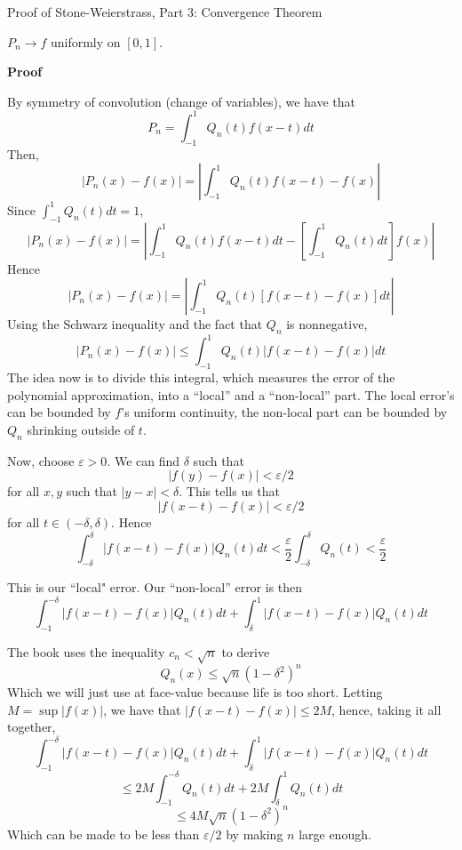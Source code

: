 \begin{result}
    {Proof of Stone-Weierstrass, Part 3: Convergence}
    {Theorem}

    $P_n \rightarrow f$ uniformly on $[0, 1]$.

    \textbf{Proof}
    
    By symmetry of convolution (change of variables), we have that
    \[P_n = \int_{-1}^1 Q_n(t)f(x-t)dt\]
    Then,
    \[|P_n(x) - f(x)| = \left|\int_{-1}^1 Q_n(t) f(x-t) - f(x)\right|\] 
    Since $\int_{-1}^1 Q_n(t)dt = 1$,
\[|P_n(x) - f(x)| =\left|\int_{-1}^1 Q_n(t)f(x-t) dt - \left[\int_{-1}^1 Q_n(t)dt\right]f(x)\right|\]
Hence
\[|P_n(x) - f(x)| =\left|\int_{-1}^1 Q_n(t)[f(x-t)-f(x)] dt\right|\]
Using the Schwarz inequality and the fact that $Q_n$ is nonnegative, 
\[|P_n(x) - f(x)| \leq \int_{-1}^1 Q_n(t)\big|f(x-t)-f(x)\big| dt\]
The idea now is to divide this integral, which measures the error of the polynomial approximation, into a ``local'' and a ``non-local'' part. The local error's can be bounded by $f$'s uniform continuity, the non-local part can be bounded by $Q_n$ shrinking outside of $t$.

Now, choose $\varepsilon > 0$. We can find $\delta$ such that 
\[|f(y) - f(x)| < \varepsilon/2\]
for all $x, y$ such that $|y-x| < \delta$. This tells us that 
\[|f(x-t) - f(x)| < \varepsilon/2\]
for all $t \in (-\delta, \delta)$. Hence
\[\int_{-\delta}^\delta |f(x-t) - f(x)| Q_n(t) dt < \frac{\varepsilon}{2}\int_{-\delta}^\delta Q_n(t) < \frac{\varepsilon}{2}\]

This is our ``local" error. Our ``non-local'' error is then
\[\int_{-1}^{-\delta} |f(x-t)-f(x)|Q_n(t)dt + \int_{\delta}^1 |f(x-t)-f(x)|Q_n(t)dt\]
\end{result}

\begin{myboxed}
    The book uses the inequality $c_n < \sqrt{n}$ to derive
    \[Q_n(x) \leq \sqrt{n}(1-\delta^2)^n\]
    Which we will just use at face-value because life is too short. Letting $M = \sup |f(x)|$, we have that $|f(x-t) - f(x)| \leq 2M$, hence, taking it all together, 
\[\int_{-1}^{-\delta} |f(x-t)-f(x)|Q_n(t)dt + \int_{\delta}^1 |f(x-t)-f(x)|Q_n(t)dt\]
\[\leq 2M \int_{-1}^{-\delta}Q_n(t)dt + 2M \int_{\delta}^{1}Q_n(t)dt\]
\[\leq 4M \sqrt{n}(1-\delta^2)^n\]
Which can be made to be less than $\varepsilon/2$ by making $n$ large enough.
\end{myboxed}
